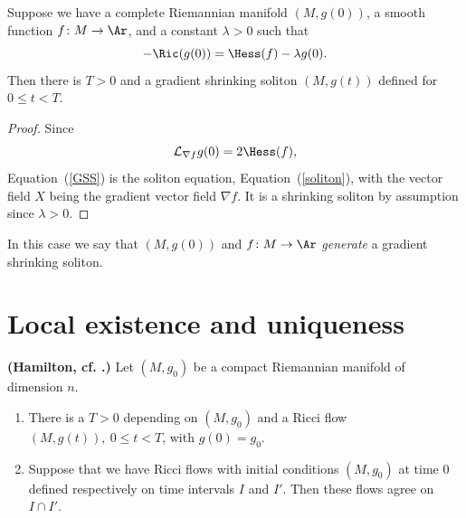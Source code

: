 \begin{proposition}\label{prop:gradient-shrinking-soliton-generation}
\label{GSSgeneration}

 Suppose we have a complete Riemannian manifold $(M,g(0))$, a
smooth function $f\colon M\to \Ar$, and a constant $\lambda>0$ such
that
\begin{equation}\label{GSS}
-\Ric(g(0))=\Hess(f)-\lambda g(0). \end{equation}
 Then there is $T>0$ and a gradient shrinking soliton
$(M,g(t))$ defined for  $0\le t<T.$ \end{proposition}

\begin{proof}
\sketch Since
$${\mathcal L}_{\nabla f}g(0)=2\Hess(f),$$
 Equation~(\ref{GSS}) is the soliton equation,
Equation~(\ref{soliton}), with the vector field $X$ being the
gradient vector field $\nabla f$. It is a shrinking soliton by
assumption since $\lambda>0$.
\end{proof}

\begin{definition}\label{def:gradient-shrinking-soliton-generator}

In this case we say that $(M,g(0))$ and $f\colon M\to \Ar$ {\em
generate} a gradient shrinking soliton.
\end{definition}


\section{Local existence and uniqueness}\label{3.3}

\begin{theorem}\label{thm:local-existence-uniqueness}
\label{compuniq}

{\bf (Hamilton, cf.
\cite{Hamilton3MPRC}.)} Let $(M,g_0)$ be a compact
Riemannian manifold of dimension $n$.
\begin{enumerate}
\item There is a $T>0$ depending on $(M,g_0)$ and  a Ricci flow
$(M,g(t)),\  0\le t<T$, with $g(0)=g_0$.
\item Suppose that we have Ricci flows with initial conditions $(M,g_0)$ at time
$0$ defined respectively on time intervals $I$ and $I'$. Then these
flows agree on $I\cap I'$. \end{enumerate}
\end{theorem}

